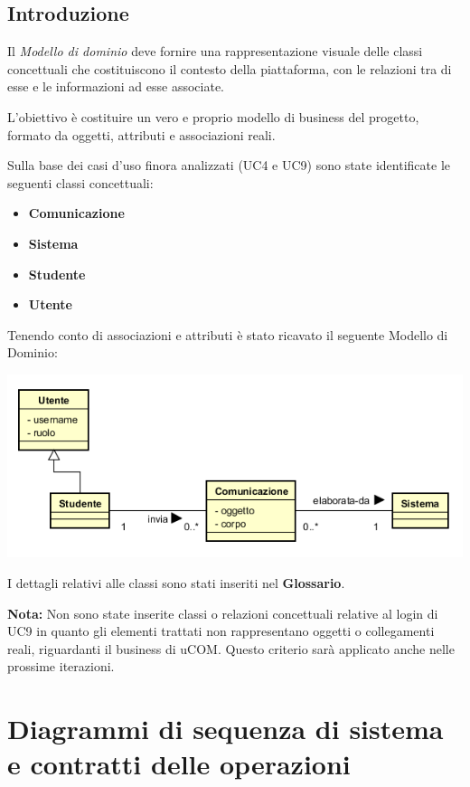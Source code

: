 \documentclass[12pt]{report}
\begin{document}
	\subsection{Introduzione}
	
	Il \textit{Modello di dominio} deve fornire una rappresentazione visuale delle classi concettuali che costituiscono il contesto della piattaforma, con le relazioni tra di esse e le informazioni ad esse associate. 
	
	L'obiettivo è costituire un vero e proprio modello di business del progetto, formato da oggetti, attributi e associazioni reali.
	
	Sulla base dei casi d'uso finora analizzati (UC4 e UC9) sono state identificate le seguenti classi concettuali:
	\begin{itemize}
		\item \textbf{Comunicazione}
		\item \textbf{Sistema}		
		\item \textbf{Studente}
		\item \textbf{Utente}
	\end{itemize}

	Tenendo conto di associazioni e attributi è stato ricavato il seguente Modello di Dominio:
	
	\begin{center}	
	\includegraphics{./images/domain-I1.png}
	\end{center}
	
	I dettagli relativi alle classi sono stati inseriti nel \textbf{Glossario}.
	
	\textbf{Nota:} Non sono state inserite classi o relazioni concettuali relative al login di UC9 in quanto gli elementi trattati non rappresentano oggetti o collegamenti reali, riguardanti il business di uCOM. Questo criterio sarà applicato anche nelle prossime iterazioni.
	
	\newpage
	
	\section{Diagrammi di sequenza di sistema e contratti delle operazioni}
	
\end{document}
